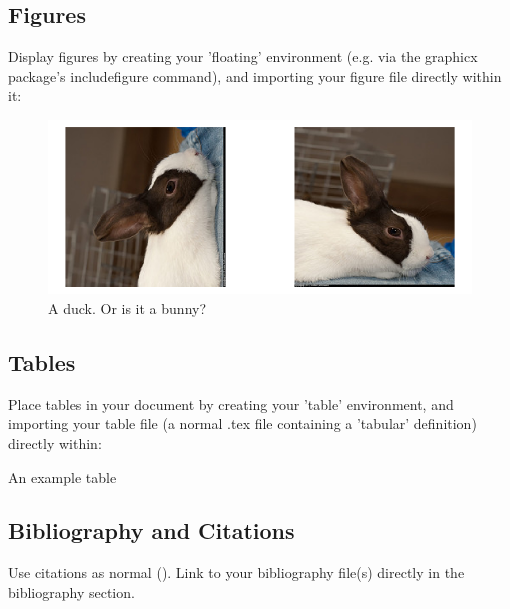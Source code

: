 \documentclass{dependencies/styles/IEEEtran}
\begin{document}
    \subsection{ Figures }

      Display figures by creating your 'floating' environment (e.g. via the graphicx package's includefigure command), and importing your figure file directly within it:

      \begin{figure}[h]
        \centering
        \includegraphics[width=1\linewidth]{resources/figures/duckbunny}
        \caption{A duck. Or is it a bunny?}
        \label{fig:duckbunny}
      \end{figure}

    \subsection{ Tables }

      Place tables in your document by creating your 'table' environment, and importing your table file (a normal .tex file containing a 'tabular' definition) directly within:

    \begin{table}[h]
      \caption{An example table}
      \centering
      
      \label{tab:ExampleTable}
    \end{table}

    \subsection{ Bibliography and Citations }

      Use citations as normal (\cite{Papastylianou2021}). Link to your bibliography file(s) directly in the bibliography section.


  
  
\end{document}
